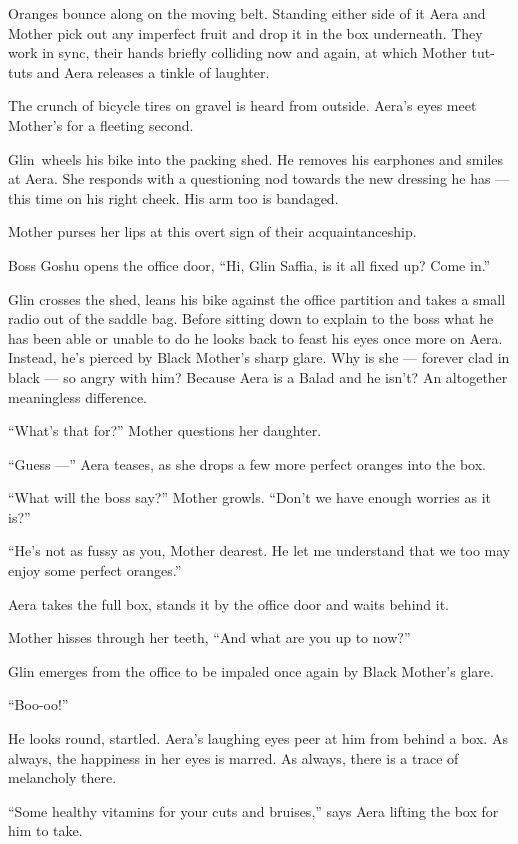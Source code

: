 \documentclass[twoside,11pt]{book}
\begin{document}
Oranges bounce along on the moving belt. Standing either side of it Aera and Mother pick out any imperfect fruit and
drop it in the box underneath. They work in sync, their hands briefly colliding now and again, at which Mother tut-tuts
and Aera releases a tinkle of laughter.

The crunch of bicycle tires on gravel is heard from outside. Aera's eyes meet Mother's for a fleeting second.

Glin~wheels his bike into the packing shed. He removes his earphones and smiles at Aera. She responds with a questioning
nod towards the new dressing he has --- this time on his right cheek. His arm too is bandaged.

Mother purses her lips at this overt sign of their acquaintanceship.

Boss Goshu opens the office door, ``Hi, Glin Saffia, is it all fixed up? Come in.''

Glin crosses the shed, leans his bike against the office partition and takes a small radio out of the saddle bag. Before
sitting down to explain to the boss what he has been able or unable to do he looks back to feast his eyes once more on
Aera. Instead, he's pierced by Black Mother's sharp glare. Why is she --- forever clad in black --- so angry with him?
Because Aera is a Balad and he isn't? An altogether meaningless difference.

``What's that for?'' Mother questions her daughter.

``Guess ---'' Aera teases, as she drops a few more perfect oranges into the box.

``What will the boss say?'' Mother growls. ``Don't we have enough worries as it
is?''

``He's not as fussy as you, Mother dearest. He let me understand that we too may enjoy some perfect
oranges.''

Aera takes the full box, stands it by the office door and waits behind it.

Mother hisses through her teeth, ``And what are you up to now?''

Glin emerges from the office to be impaled once again by Black Mother's glare.

``Boo-oo!''

He looks round, startled. Aera's laughing eyes peer at him from behind a box. As always, the happiness in her eyes is
marred. As always, there is a trace of melancholy there.

``Some healthy vitamins for your cuts and bruises,'' says Aera lifting the box for him to
take.
\end{document}
